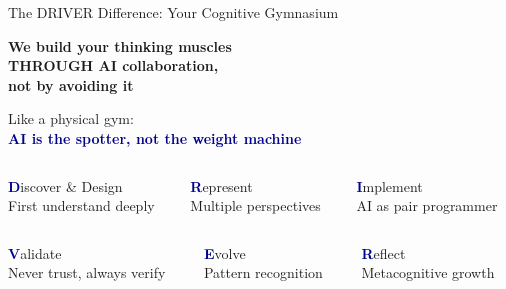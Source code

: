 \documentclass[aspectratio=169,12pt]{beamer}
\begin{document}
\begin{frame}{The DRIVER Difference: Your Cognitive Gymnasium}
\begin{center}
\Large
\textbf{We build your thinking muscles\\
THROUGH AI collaboration,\\
not by avoiding it}

\vspace{0.5cm}
\normalsize
Like a physical gym:\\
\textcolor{darkblue}{\textbf{AI is the spotter, not the weight machine}}
\end{center}

\vspace{0.3cm}
\begin{columns}[t]
\begin{column}{0.33\textwidth}
\centering
\textcolor{darkblue}{\textbf{D}}iscover \& Design\\
\small First understand deeply
\end{column}
\begin{column}{0.33\textwidth}
\centering
\textcolor{darkblue}{\textbf{R}}epresent\\
\small Multiple perspectives
\end{column}
\begin{column}{0.33\textwidth}
\centering
\textcolor{darkblue}{\textbf{I}}mplement\\
\small AI as pair programmer
\end{column}
\end{columns}

\vspace{0.3cm}
\begin{columns}[t]
\begin{column}{0.33\textwidth}
\centering
\textcolor{darkblue}{\textbf{V}}alidate\\
\small Never trust, always verify
\end{column}
\begin{column}{0.33\textwidth}
\centering
\textcolor{darkblue}{\textbf{E}}volve\\
\small Pattern recognition
\end{column}
\begin{column}{0.33\textwidth}
\centering
\textcolor{darkblue}{\textbf{R}}eflect\\
\small Metacognitive growth
\end{column}
\end{columns}
\end{frame}
\end{document}
